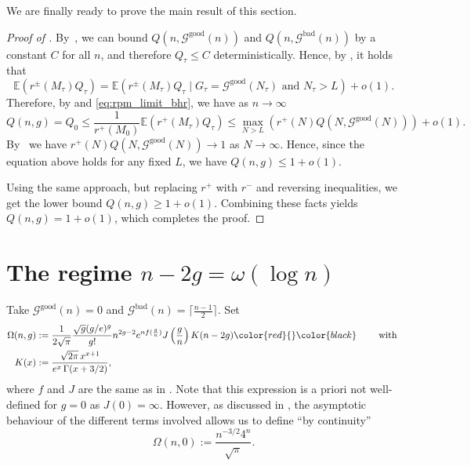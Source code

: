 \documentclass[a4paper,12pt]{article}
\theoremstyle{definition}
\newcommand{\good}[1]{\mathcal{G}^{\text{good}}({#1})}
\newcommand{\goodG}{\good{n}}
\newcommand{\goodGNT}{\good{N_\tau}}
\newcommand{\bad}[1]{\mathcal{G}^{\text{bad}}({#1})}
\newcommand{\badG}{\bad{n}}
\begin{document}
We are finally ready to prove the main result of this section.
\begin{proof}[Proof of ]

    By~, we can bound $Q(n,\goodG)$ and $Q(n,\badG)$ by a constant $C$ for all $n$, and therefore $Q_\tau\leq C$ deterministically. Hence, by , it holds that
    \[\mathbb{E}(r^{\pm}(M_{\tau})Q_\tau)=\mathbb{E}(r^{\pm}(M_{\tau})Q_\tau \mid G_\tau=\goodGNT\text{ and }N_{\tau}>L)+o(1).\]
    Therefore, by  and \eqref{eq:rpm_limit_bhr}, we have as $n\to\infty$
    \[Q(n,g)=Q_0\leq\frac{1}{r^{+}(M_0)}\mathbb{E}\left(r^{+}(M_{\tau}) Q_\tau \right)\leq \max_{N>L}(r^{+}(N)Q(N,\good{N}))+o(1).\]
    By~ we have $r^{+}(N)Q(N,\good{N})\to 1$ as $N\to\infty$. Hence, since the equation above holds for any fixed $L$, we have $Q(n,g)\leq 1+o(1)$.
    
    Using the same approach, but replacing $r^{+}$ with $r^{-}$ and reversing inequalities, we get the lower bound $Q(n,g)\geq 1+o(1)$. Combining these facts yields $Q(n,g)= 1+o(1)$, which completes the proof.
    
\end{proof}



\section{The regime $n-2g=\omega(\log n)$}\label{sec:largev}

Take $\goodG=0$ and $\badG=\lceil\frac{n-1}{2}\rceil$. Set \begin{align}\label{eq_def_Olarge}
    \Omega(n,g)&:=\frac{1}{2\sqrt{\pi}} \frac{\sqrt{g}(g/e)^g}{g!}n^{2g-2}e^{nf(\frac{g}{n})}{J}\left(\frac{g}{n}\right)K(n-2g)\color{red}{}\color{black} \qquad \text{ with } \\
    K(x)&:=\frac{\sqrt{2\pi} \, x^{x+1}}{e^{x} \, \Gamma(x+3/2)},
    \notag
\end{align}
where $f$ and $J$ are the same as in .
%
Note that this expression is a priori not well-defined for $g=0$ as $J(0)=\infty$.
However, as discussed in , the asymptotic behaviour of the different terms involved allows us to define ``by continuity''
\[\Omega(n,0):=\frac{n^{-3/2}4^n}{\sqrt{\pi}}.\]
\end{document}
